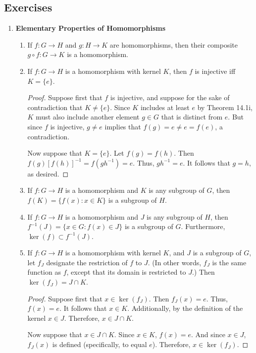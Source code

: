 \documentclass[../notes.tex]{subfiles}
\begin{document}
\subsection*{Exercises}
\begin{enumerate}[label={\textbf{\Alph*.}}]
    \setcounter{enumi}{2}
    \item \textbf{Elementary Properties of Homomorphisms}
    \begin{enumerate}
        \item If $f:G\to H$ and $g:H\to K$ are homomorphisms, then their composite $g\circ f:G\to K$ is a homomorphism.
        \item If $f:G\to H$ is a homomorphism with kernel $K$, then $f$ is injective iff $K=\{e\}$.
        \begin{proof}
            Suppose first that $f$ is injective, and suppose for the sake of contradiction that $K\neq\{e\}$. Since $K$ includes at least $e$ by Theorem 14.1i, $K$ must also include another element $g\in G$ that is distinct from $e$. But since $f$ is injective, $g\neq e$ implies that $f(g)=e\neq e=f(e)$, a contradiction.\par
            Now suppose that $K=\{e\}$. Let $f(g)=f(h)$. Then $f(g)[f(h)]^{-1}=f(gh^{-1})=e$. Thus, $gh^{-1}=e$. It follows that $g=h$, as desired.
        \end{proof}
        \item If $f:G\to H$ is a homomorphism and $K$ is any subgroup of $G$, then $f(K)=\{f(x):x\in K\}$ is a subgroup of $H$.
        \item If $f:G\to H$ is a homomorphism and $J$ is any subgroup of $H$, then $f^{-1}(J)=\{x\in G:f(x)\in J\}$ is a subgroup of $G$. Furthermore, $\ker(f)\subset f^{-1}(J)$.
        \item If $f:G\to H$ is a homomorphism with kernel $K$, and $J$ is a subgroup of $G$, let $f_J$ designate the restriction of $f$ to $J$. (In other words, $f_J$ is the same function as $f$, except that its domain is restricted to $J$.) Then $\ker(f_J)=J\cap K$.
        \begin{proof}
            Suppose first that $x\in\ker(f_J)$. Then $f_J(x)=e$. Thus, $f(x)=e$. It follows that $x\in K$. Additionally, by the definition of the kernel $x\in J$. Therefore, $x\in J\cap K$.\par
            Now suppose that $x\in J\cap K$. Since $x\in K$, $f(x)=e$. And since $x\in J$, $f_J(x)$ is defined (specifically, to equal $e$). Therefore, $x\in\ker(f_J)$.
        \end{proof}

\end{enumerate}
\end{enumerate}
\end{document}

